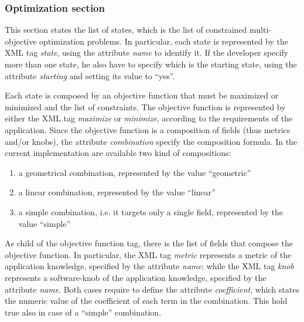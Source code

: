 \subsubsection*{Optimization section}

This section states the list of states, which is the list of constrained multi-objective optimization problems.
In particular, each state is represented by the XML tag \textit{state}, using the attribute \textit{name} to identify it.
If the developer specify more than one state, he also have to specify which is the starting state, using the attribute \textit{starting} and setting its value to ``yes''.


Each state is composed by an objective function that must be maximized or minimized and the list of constraints.
The objective function is represented by either the XML tag \textit{maximize} or \textit{minimize}, according to the requirements of the application.
Since the objective function is a composition of fields (thus metrics and/or knobs), the attribute \textit{combination} specify the composition formula.
In the current implementation are available two kind of compositions:
\begin{enumerate}
	\item a geometrical combination, represented by the value ``geometric''
	\item a linear combination, represented by the value ``linear''
	\item a simple combination, i.e. it targets only a single field, represented by the value ``simple''
\end{enumerate}
As child  of the objective function tag, there is the list of fields that compose the objective function.
In particular, the XML tag \textit{metric} represents a metric of the application knowledge, specified by the attribute \textit{name}; while the XML tag \textit{knob} represents a software-knob of the application knowledge, specified by the attribute \textit{name}.
Both cases require to define the attribute \textit{coefficient}, which states the numeric value of the coefficient of each term in the combination.
This hold true also in case of a ``simple'' combination.


